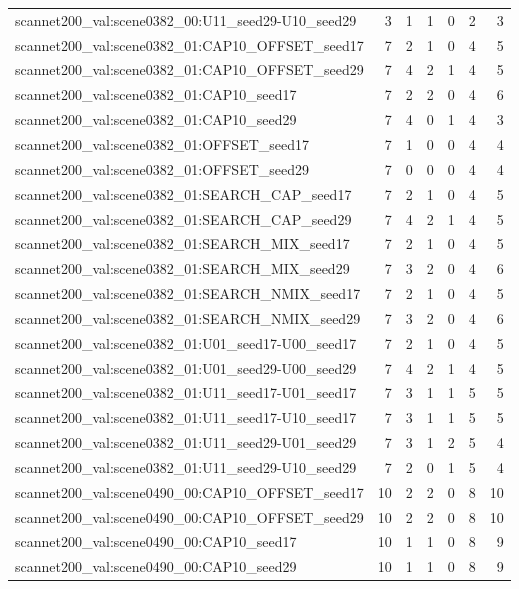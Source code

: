 \begin{table}[t]
\begin{tabular}{lrrrrrr}
scannet200\_val:scene0382\_00:U11\_seed29-U10\_seed29 & 3 & 1 & 1 & 0 & 2 & 3 \\
scannet200\_val:scene0382\_01:CAP10\_OFFSET\_seed17 & 7 & 2 & 1 & 0 & 4 & 5 \\
scannet200\_val:scene0382\_01:CAP10\_OFFSET\_seed29 & 7 & 4 & 2 & 1 & 4 & 5 \\
scannet200\_val:scene0382\_01:CAP10\_seed17 & 7 & 2 & 2 & 0 & 4 & 6 \\
scannet200\_val:scene0382\_01:CAP10\_seed29 & 7 & 4 & 0 & 1 & 4 & 3 \\
scannet200\_val:scene0382\_01:OFFSET\_seed17 & 7 & 1 & 0 & 0 & 4 & 4 \\
scannet200\_val:scene0382\_01:OFFSET\_seed29 & 7 & 0 & 0 & 0 & 4 & 4 \\
scannet200\_val:scene0382\_01:SEARCH\_CAP\_seed17 & 7 & 2 & 1 & 0 & 4 & 5 \\
scannet200\_val:scene0382\_01:SEARCH\_CAP\_seed29 & 7 & 4 & 2 & 1 & 4 & 5 \\
scannet200\_val:scene0382\_01:SEARCH\_MIX\_seed17 & 7 & 2 & 1 & 0 & 4 & 5 \\
scannet200\_val:scene0382\_01:SEARCH\_MIX\_seed29 & 7 & 3 & 2 & 0 & 4 & 6 \\
scannet200\_val:scene0382\_01:SEARCH\_NMIX\_seed17 & 7 & 2 & 1 & 0 & 4 & 5 \\
scannet200\_val:scene0382\_01:SEARCH\_NMIX\_seed29 & 7 & 3 & 2 & 0 & 4 & 6 \\
scannet200\_val:scene0382\_01:U01\_seed17-U00\_seed17 & 7 & 2 & 1 & 0 & 4 & 5 \\
scannet200\_val:scene0382\_01:U01\_seed29-U00\_seed29 & 7 & 4 & 2 & 1 & 4 & 5 \\
scannet200\_val:scene0382\_01:U11\_seed17-U01\_seed17 & 7 & 3 & 1 & 1 & 5 & 5 \\
scannet200\_val:scene0382\_01:U11\_seed17-U10\_seed17 & 7 & 3 & 1 & 1 & 5 & 5 \\
scannet200\_val:scene0382\_01:U11\_seed29-U01\_seed29 & 7 & 3 & 1 & 2 & 5 & 4 \\
scannet200\_val:scene0382\_01:U11\_seed29-U10\_seed29 & 7 & 2 & 0 & 1 & 5 & 4 \\
scannet200\_val:scene0490\_00:CAP10\_OFFSET\_seed17 & 10 & 2 & 2 & 0 & 8 & 10 \\
scannet200\_val:scene0490\_00:CAP10\_OFFSET\_seed29 & 10 & 2 & 2 & 0 & 8 & 10 \\
scannet200\_val:scene0490\_00:CAP10\_seed17 & 10 & 1 & 1 & 0 & 8 & 9 \\
scannet200\_val:scene0490\_00:CAP10\_seed29 & 10 & 1 & 1 & 0 & 8 & 9 \\

\end{tabular}
\end{table}
